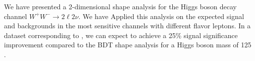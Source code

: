We have presented a 2-dimensional shape analysis 
for the Higgs boson decay channel $W^+W^- \to 2\ell2\nu$.
We have Applied this analysis on the expected signal and backgrounds
in the most sensitive channels with different flavor leptons.
In a dataset corresponding to \intlumiEightTeV,
we can expect to achieve a 25\% signal significance improvement
compared to the BDT shape analysis
for a Higgs boson mass of 125 \GeV.

